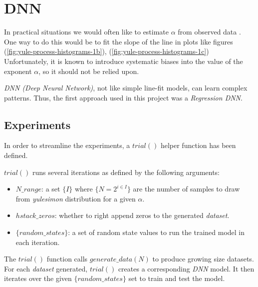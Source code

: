 \documentclass[a4paper, 12pt]{report}
\begin{document}
\section{DNN}
In practical situations we would often like to estimate $\alpha$ from observed data \cite{newman}. One way to do this would be to fit the slope of the line in plots like figures (\ref{fig:yule-process-histograms-1b}), (\ref{fig:yule-process-histograms-1c}) Unfortunately, it is known to introduce systematic biases into the value of the exponent $\alpha$, so it should not be relied
upon.

\textit{DNN (Deep Neural Network)}, not like simple line-fit models, can learn complex patterns. Thus, the first approach used in this project was a \textit{Regression DNN}.

\subsection{Experiments}
In order to streamline the experiments, a $trial()$ helper function has been defined.

$trial()$ runs several iterations as defined by the following arguments:

\begin{itemize}
  \item $N\_range$: a set $\{I\}$ where $\{N = 2^{i\in I}\}$ are the number of samples to draw from \textit{yulesimon} distribution for a given $\alpha$.
  \item $hstack\_zeros$: whether to right append zeros to the generated \textit{dataset}.
  \item $\{random\_states\}$: a set of random state values to run the trained model in each iteration.
\end{itemize}

The $trial()$ function calls $generate\_data(N)$ to produce growing size datasets. For each \textit{dataset} generated, $trial()$ creates a corresponding \textit{DNN} model. It then iterates over the given $\{random\_states\}$ set to train and test the model.
\end{document}

